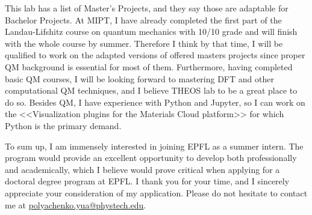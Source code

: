 \documentclass[12pt, a4paper]{awesome-cv}
\begin{document}
\begin{cvletter}
This lab has a list of Master's Projects, and they say those are adaptable for Bachelor Projects. At MIPT, I have already completed the first part of the Landau-Lifshitz course on quantum mechanics with 10/10 grade and will finish with the whole course by summer. Therefore I think by that time, I will be qualified to work on the adapted versions of offered masters projects since proper QM background is essential for most of them. Furthermore, having completed basic QM courses, I will be looking forward to mastering DFT and other computational QM techniques, and I believe THEOS lab to be a great place to do so. Besides QM, I have experience with Python and Jupyter, so I can work on the <<Visualization plugins for the Materials Cloud platform>> for which Python is the primary demand.


\end{cvletter}



To sum up, I am immensely interested in joining EPFL as a summer intern. The program would provide an excellent opportunity to develop both professionally and academically, which I believe would prove critical when applying for a doctoral degree program at EPFL. I thank you for your time, and I sincerely appreciate your consideration of my application. Please do not hesitate to contact me at \href{mailto:polyachenko.yua@phystech.edu}{polyachenko.yua@phystech.edu}.


\makeletterclosing
\end{document}

